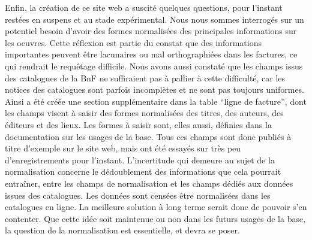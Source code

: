 \vspace{1.5cm}
Enfin, la création de ce site web a suscité quelques questions, pour l'instant restées en suspens et au stade expérimental. Nous nous sommes interrogés sur un potentiel besoin d'avoir des formes normalisées des principales informations sur les oeuvres. Cette réflexion est partie du constat que des informations importantes peuvent être lacunaires ou mal orthographiées dans les factures, ce qui rendrait le requêtage difficile. Nous avons aussi constaté que les champs issus des catalogues de la BnF ne suffiraient pas à pallier à cette difficulté, car les notices des catalogues sont parfois incomplètes et ne sont pas toujours uniformes. Ainsi a été créée une section supplémentaire dans la table \enquote{ligne de facture}, dont les champs visent à saisir des formes normalisées des titres, des auteurs, des éditeurs et des lieux. Les formes à saisir sont, elles aussi, définies dans la documentation sur les usages de la base. Tous ces champs sont donc  publiés à titre d'exemple sur le site web, mais ont été essayés sur très peu d'enregistrements pour l'instant. 
L'incertitude qui demeure au sujet de la normalisation concerne le dédoublement des informations que cela pourrait entraîner, entre les champs de normalisation et les champs dédiés aux données issues des catalogues. Les données sont censées être normalisées dans les catalogues en ligne. La meilleure solution à long terme serait donc de pouvoir s'en contenter. Que cette idée soit maintenue ou non dans les futurs usages de la base, la question de la normalisation est essentielle, et devra se poser. 


